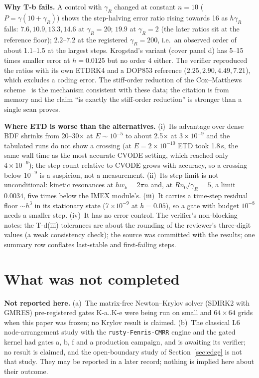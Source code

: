 \documentclass[11pt,a4paper]{article}
\begin{document}
\textbf{Why T-b fails.} A control with $\gamma_R$ changed at constant $n=10$ ($P=\gamma(10+\gamma_R)$) shows the step-halving error ratio rising towards 16 as
$h\gamma_R$ falls: $7.6, 10.9, 13.3, 14.6$ at $\gamma_R=20$; $19.9$ at $\gamma_R=2$ (the later ratios sit at the reference floor);
$2.2$--$7.2$ at the registered $\gamma_R=200$, i.e.\ an observed order of about 1.1--1.5 at the largest steps. Krogstad's variant
(cover panel d) has 5--15 times smaller error at $h=0.0125$ but no order 4 either. The verifier reproduced the ratios with its own ETDRK4 and a DOP853 reference ($2.25,2.90,4.49,7.21$), which excludes a
coding error. The stiff-order reduction of the Cox--Matthews scheme~\cite{HochbruckOstermann2005} is the mechanism consistent with these
data; the citation is from memory and the claim ``is exactly the stiff-order reduction'' is stronger than a single scan proves.

\textbf{Where ETD is worse than the alternatives.} (i)~Its advantage over dense BDF shrinks from 20--30$\times$ at $E\sim10^{-5}$ to about 2.5$\times$ at $3\times10^{-9}$ and the tabulated
runs do not show a crossing (at $E=2\times10^{-10}$ ETD took 1.8\,s, the same wall time as the most accurate CVODE setting, which reached
only $4\times10^{-9}$); the step count relative to CVODE grows with accuracy, so a crossing below $10^{-9}$ is a suspicion, not a measurement. (ii)~Its step limit is
not unconditional: kinetic resonances at $hw_k=2\pi n$ and, at $Rn_0/\gamma_R=5$, a limit $0.0034$, five times below the IMEX
module's. (iii)~It carries a time-step residual floor $\sim h^3$ in its stationary state (7\,$\times10^{-9}$ at $h=0.05$), so a gate with
budget $10^{-8}$ needs a smaller step. (iv)~It has no error control. The verifier's non-blocking notes: the T-d(iii) tolerances are about
the rounding of the reviewer's three-digit values (a weak consistency check); the source was committed with the results; one summary row
conflates last-stable and first-failing steps.

\section{What was not completed}\label{sec:notdone}

\begin{failbox}
\textbf{Not reported here.} (a)~The matrix-free Newton--Krylov solver (SDIRK2 with GMRES) pre-registered gates K-a..K-e were being run on
small and $64\times64$ grids when this paper was frozen; no Krylov result is claimed. (b)~The classical L6 node-arrangement study with the \texttt{rusty-Fenris-CMRR} engine and the gated kernel
had gates a, b, f and a production campaign, and is awaiting its verifier; no result is claimed, and the open-boundary study of
Section~\ref{sec:edge} is not that study. They may be reported in a later record; nothing is implied here about their outcome.
\end{failbox}
\end{document}
